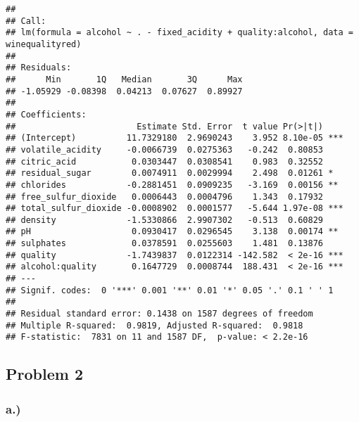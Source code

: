 \documentclass[
]{article}
\begin{document}
\begin{verbatim}
## 
## Call:
## lm(formula = alcohol ~ . - fixed_acidity + quality:alcohol, data = winequalityred)
## 
## Residuals:
##      Min       1Q   Median       3Q      Max 
## -1.05929 -0.08398  0.04213  0.07627  0.89927 
## 
## Coefficients:
##                        Estimate Std. Error  t value Pr(>|t|)    
## (Intercept)          11.7329180  2.9690243    3.952 8.10e-05 ***
## volatile_acidity     -0.0066739  0.0275363   -0.242  0.80853    
## citric_acid           0.0303447  0.0308541    0.983  0.32552    
## residual_sugar        0.0074911  0.0029994    2.498  0.01261 *  
## chlorides            -0.2881451  0.0909235   -3.169  0.00156 ** 
## free_sulfur_dioxide   0.0006443  0.0004796    1.343  0.17932    
## total_sulfur_dioxide -0.0008902  0.0001577   -5.644 1.97e-08 ***
## density              -1.5330866  2.9907302   -0.513  0.60829    
## pH                    0.0930417  0.0296545    3.138  0.00174 ** 
## sulphates             0.0378591  0.0255603    1.481  0.13876    
## quality              -1.7439837  0.0122314 -142.582  < 2e-16 ***
## alcohol:quality       0.1647729  0.0008744  188.431  < 2e-16 ***
## ---
## Signif. codes:  0 '***' 0.001 '**' 0.01 '*' 0.05 '.' 0.1 ' ' 1
## 
## Residual standard error: 0.1438 on 1587 degrees of freedom
## Multiple R-squared:  0.9819, Adjusted R-squared:  0.9818 
## F-statistic:  7831 on 11 and 1587 DF,  p-value: < 2.2e-16
\end{verbatim}

\hypertarget{problem-2}{%
\subsection{Problem 2}\label{problem-2}}

\hypertarget{a.-1}{%
\subsubsection{a.)}\label{a.-1}}
\end{document}
